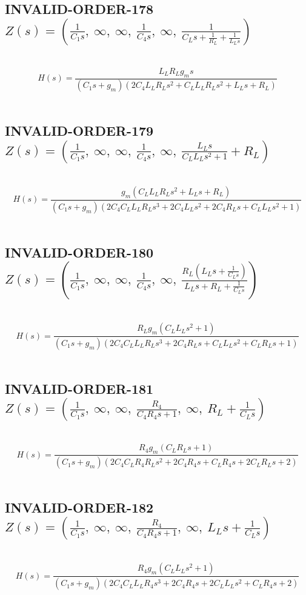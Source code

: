 \documentclass{article}
\begin{document}
\subsection{INVALID-ORDER-178 $Z(s) = \left( \frac{1}{C_{1} s}, \  \infty, \  \infty, \  \frac{1}{C_{4} s}, \  \infty, \  \frac{1}{C_{L} s + \frac{1}{R_{L}} + \frac{1}{L_{L} s}}\right)$ } \ 
\textbf{\[H(s) = \frac{L_{L} R_{L} g_{m} s}{\left(C_{1} s + g_{m}\right) \left(2 C_{4} L_{L} R_{L} s^{2} + C_{L} L_{L} R_{L} s^{2} + L_{L} s + R_{L}\right)}\] } \ 
\subsection{INVALID-ORDER-179 $Z(s) = \left( \frac{1}{C_{1} s}, \  \infty, \  \infty, \  \frac{1}{C_{4} s}, \  \infty, \  \frac{L_{L} s}{C_{L} L_{L} s^{2} + 1} + R_{L}\right)$ } \ 
\textbf{\[H(s) = \frac{g_{m} \left(C_{L} L_{L} R_{L} s^{2} + L_{L} s + R_{L}\right)}{\left(C_{1} s + g_{m}\right) \left(2 C_{4} C_{L} L_{L} R_{L} s^{3} + 2 C_{4} L_{L} s^{2} + 2 C_{4} R_{L} s + C_{L} L_{L} s^{2} + 1\right)}\] } \ 
\subsection{INVALID-ORDER-180 $Z(s) = \left( \frac{1}{C_{1} s}, \  \infty, \  \infty, \  \frac{1}{C_{4} s}, \  \infty, \  \frac{R_{L} \left(L_{L} s + \frac{1}{C_{L} s}\right)}{L_{L} s + R_{L} + \frac{1}{C_{L} s}}\right)$ } \ 
\textbf{\[H(s) = \frac{R_{L} g_{m} \left(C_{L} L_{L} s^{2} + 1\right)}{\left(C_{1} s + g_{m}\right) \left(2 C_{4} C_{L} L_{L} R_{L} s^{3} + 2 C_{4} R_{L} s + C_{L} L_{L} s^{2} + C_{L} R_{L} s + 1\right)}\] } \ 
\subsection{INVALID-ORDER-181 $Z(s) = \left( \frac{1}{C_{1} s}, \  \infty, \  \infty, \  \frac{R_{4}}{C_{4} R_{4} s + 1}, \  \infty, \  R_{L} + \frac{1}{C_{L} s}\right)$ } \ 
\textbf{\[H(s) = \frac{R_{4} g_{m} \left(C_{L} R_{L} s + 1\right)}{\left(C_{1} s + g_{m}\right) \left(2 C_{4} C_{L} R_{4} R_{L} s^{2} + 2 C_{4} R_{4} s + C_{L} R_{4} s + 2 C_{L} R_{L} s + 2\right)}\] } \ 
\subsection{INVALID-ORDER-182 $Z(s) = \left( \frac{1}{C_{1} s}, \  \infty, \  \infty, \  \frac{R_{4}}{C_{4} R_{4} s + 1}, \  \infty, \  L_{L} s + \frac{1}{C_{L} s}\right)$ } \ 
\textbf{\[H(s) = \frac{R_{4} g_{m} \left(C_{L} L_{L} s^{2} + 1\right)}{\left(C_{1} s + g_{m}\right) \left(2 C_{4} C_{L} L_{L} R_{4} s^{3} + 2 C_{4} R_{4} s + 2 C_{L} L_{L} s^{2} + C_{L} R_{4} s + 2\right)}\] } \ 
\end{document}
